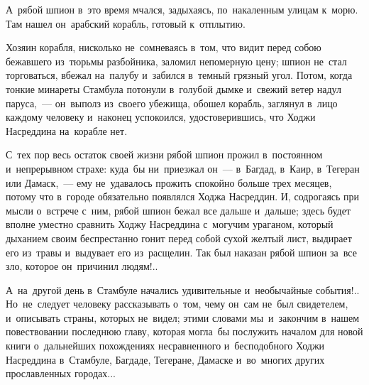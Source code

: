 \documentclass[12pt,a4paper]{book}
\begin{document}
А~рябой шпион в~это время мчался, задыхаясь, по~накаленным улицам к~морю. Там нашел он~арабский корабль, готовый к~отплытию.

Хозяин корабля, нисколько не~сомневаясь в~том, что видит перед собою бежавшего из~тюрьмы разбойника, заломил непомерную цену; шпион не~стал торговаться, вбежал на~палубу и~забился в~темный грязный угол. Потом, когда тонкие минареты Стамбула потонули в~голубой дымке и~свежий ветер надул паруса,~— он~выполз из~своего убежища, обошел корабль, заглянул в~лицо каждому человеку и~наконец успокоился, удостоверившись, что Ходжи Насреддина на~корабле нет.

С~тех пор весь остаток своей жизни рябой шпион прожил в~постоянном и~непрерывном страхе: куда~бы ни~приезжал он~— в~Багдад, в~Каир, в~Тегеран или Дамаск,~— ему не~удавалось прожить спокойно больше трех месяцев, потому что в~городе обязательно появлялся Ходжа Насреддин. И, содрогаясь при мысли о~встрече с~ним, рябой шпион бежал все дальше и~дальше; здесь будет вполне уместно сравнить Ходжу Насреддина с~могучим ураганом, который дыханием своим беспрестанно гонит перед собой сухой желтый лист, выдирает его из~травы и~выдувает его из~расщелин. Так был наказан рябой шпион за~все зло, которое он~причинил людям!..

А~на~другой день в~Стамбуле начались удивительные и~необычайные события!.. Но~не~следует человеку рассказывать о~том, чему он~сам не~был свидетелем, и~описывать страны, которых не~видел; этими словами мы~и~закончим в~нашем повествовании последнюю главу, которая могла~бы послужить началом для новой книги о~дальнейших похождениях несравненного и~бесподобного Ходжи Насреддина в~Стамбуле, Багдаде, Тегеране, Дамаске и~во~многих других прославленных городах...
\end{document}
